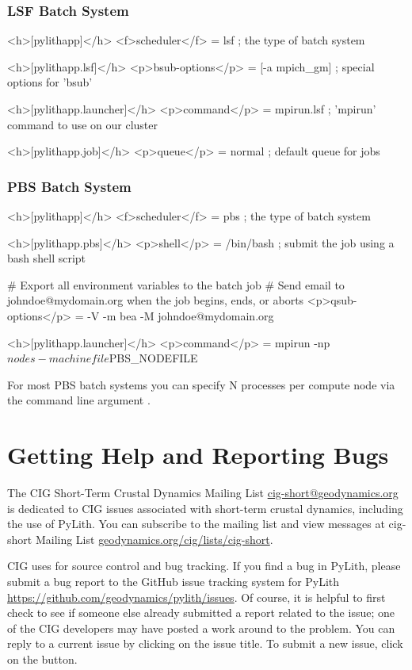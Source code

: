 \subsubsection{LSF Batch System}
\begin{cfg}
<h>[pylithapp]</h>
<f>scheduler</f> = lsf    ; the type of batch system

<h>[pylithapp.lsf]</h>
<p>bsub-options</p> = [-a mpich_gm]    ; special options for 'bsub'

<h>[pylithapp.launcher]</h>
<p>command</p> = mpirun.lsf    ; 'mpirun' command to use on our cluster

<h>[pylithapp.job]</h>
<p>queue</p> = normal    ; default queue for jobs
\end{cfg}

\subsubsection{PBS Batch System}
\begin{cfg}
<h>[pylithapp]</h>
<f>scheduler</f> = pbs     ; the type of batch system

<h>[pylithapp.pbs]</h>
<p>shell</p> = /bin/bash     ; submit the job using a bash shell script

# Export all environment variables to the batch job
# Send email to johndoe@mydomain.org when the job begins, ends, or aborts
<p>qsub-options</p> = -V -m bea -M johndoe@mydomain.org

<h>[pylithapp.launcher]</h>
<p>command</p> = mpirun -np ${nodes} -machinefile ${PBS_NODEFILE}
\end{cfg}
For most PBS batch systems you can specify N processes per compute
node via the command line argument .

\section{Getting Help and Reporting Bugs}
\label{sec:help}

The CIG Short-Term
Crustal Dynamics Mailing List \url{cig-short@geodynamics.org} is
dedicated to CIG issues associated with short-term crustal dynamics,
including the use of PyLith. You can subscribe to the mailing list and
view messages at cig-short Mailing List
\url{geodynamics.org/cig/lists/cig-short}.

CIG uses  for source control and bug tracking. If you
find a bug in PyLith, please submit a bug report to the GitHub issue
tracking system for PyLith \url{https://github.com/geodynamics/pylith/issues}.
Of course, it is helpful to first check to see if someone else already
submitted a report related to the issue; one of the CIG developers
may have posted a work around to the problem. You can reply to a current
issue by clicking on the issue title. To submit a new issue, click
on the  button.



